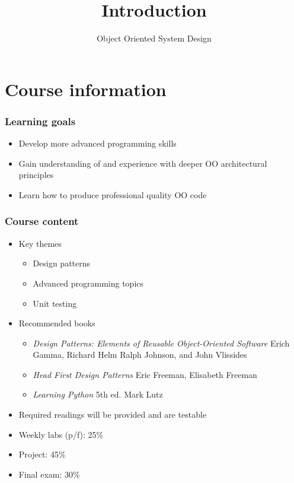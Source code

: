 \documentclass[10pt]{beamer}
\title{Introduction}
\author[IN710]{Object Oriented System Design}
\institute[Otago Polytechnic]{
  Otago Polytechnic \\
  Dunedin, New Zealand \\
}
\date{}
\begin{document}
\begin{frame}[plain]
  \titlepage
\end{frame}

\section{Course information}
\begin{frame}
  \frametitle{Learning goals}

 \begin{itemize}
  \item Develop more advanced programming skills
  \item Gain understanding of and experience with deeper
	  OO architectural principles
  \item Learn how to produce professional quality OO code
  \end{itemize}
\end{frame}

\begin{frame}
	\frametitle{Course content}
	\begin{itemize}
		\item Key themes
			\begin{itemize}
				\item Design patterns
				\item Advanced programming topics
				\item Unit testing
			\end{itemize}
		\item Recommended books
			\begin{itemize}
				\item \emph{Design Patterns: Elements of
						Reusable Object-Oriented
					Software} Erich Gamma, Richard Helm
					Ralph Johnson, and John Vlissides
				\item \emph{Head First Design Patterns}
					Eric Freeman, Elisabeth Freeman
				\item \emph{Learning Python} 5th ed. 
					Mark Lutz
			\end{itemize}
		\item Required readings will be provided and are testable
	\end{itemize}
\end{frame}

\begin{frame}
	\begin{itemize}
		\item Weekly labs (p/f): 25\%
		\item Project: 45\%
		\item Final exam: 30\%
	\end{itemize}
\end{frame}
\end{document}
